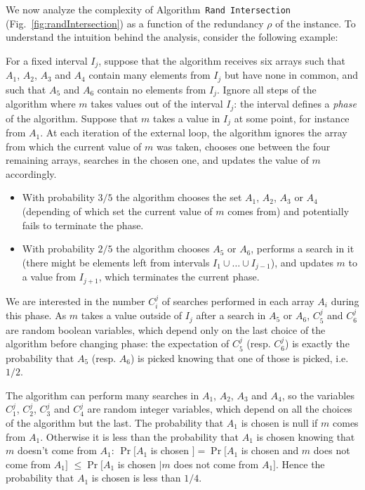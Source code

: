 We now analyze the complexity of Algorithm~{\tt Rand Intersection}
(Fig.~\ref{fig:randIntersection}) as a function of the redundancy
$\rho$ of the instance.
%
To understand the intuition behind the analysis, consider the
following example:
%
\begin{example}  

  For a fixed interval $I_j$, suppose that the algorithm receives six
  arrays such that $A_1$, $A_2$, $A_3$ and $A_4$ contain many elements
  from $I_j$ but have none in common, and such that $A_5$ and $A_6$ contain no
  elements from $I_j$.
  Ignore all steps of the algorithm where $m$ takes values out of the
  interval $I_j$: the interval defines a {\em phase} of the algorithm.
  Suppose that $m$ takes a value in $I_j$ at some point, for instance
  from $A_1$.
  At each iteration of the external loop, the algorithm ignores the
  array from which the current value of $m$ was taken, chooses one
  between the four remaining arrays, searches in the chosen one, and
  updates the value of $m$ accordingly.
  \begin{itemize}
  \item With probability $3/5$ the algorithm chooses the set $A_1$,
    $A_2$, $A_3$ or $A_4$ (depending of which set the current value of
    $m$ comes from) and potentially fails to terminate the phase.
  \item With probability $2/5$ the algorithm chooses $A_5$ or $A_6$,
    performs a search in it (there might be elements left from
    intervals $I_1\cup\ldots\cup I_{j-1}$), and updates $m$ to a value
    from $I_{j+1}$, which terminates the current phase.
  \end{itemize}

  We are interested in the number $C_i^j$ of searches performed in
  each array $A_i$ during this phase.
  As $m$ takes a value outside of $I_j$ after a search in $A_5$ or
  $A_6$, $C_5^j$ and $C_6^j$ are random boolean variables, which
  depend only on the last choice of the algorithm before
  changing phase: the expectation of $C_5^j$ (resp. $C_6^j$) is
  exactly the probability that $A_5$ (resp. $A_6$) is picked knowing
  that one of those is picked, i.e. $1/2$.

  The algorithm can perform many searches in $A_1$, $A_2$, $A_3$ and
  $A_4$, so the variables $C_1^j$, $C_2^j$, $C_3^j$ and $C_4^j$ are
  random integer variables, which depend on all the choices of the
  algorithm but the last.
  The probability that $A_1$ is chosen is null if $m$ comes from $A_1$.
  Otherwise it is less than the probability that $A_1$ is chosen
  knowing that $m$ doesn't come from $A_1$: $\Pr[A_1$ is chosen
  $] = \Pr[A_1$ is chosen and $m$ does not come from $A_1]$
  $\leq \Pr[A_1$ is chosen $ | m $ does not come from
    $A_1].$
  Hence the probability that $A_1$ is chosen is less than $1/4$.
  

\end{example}
